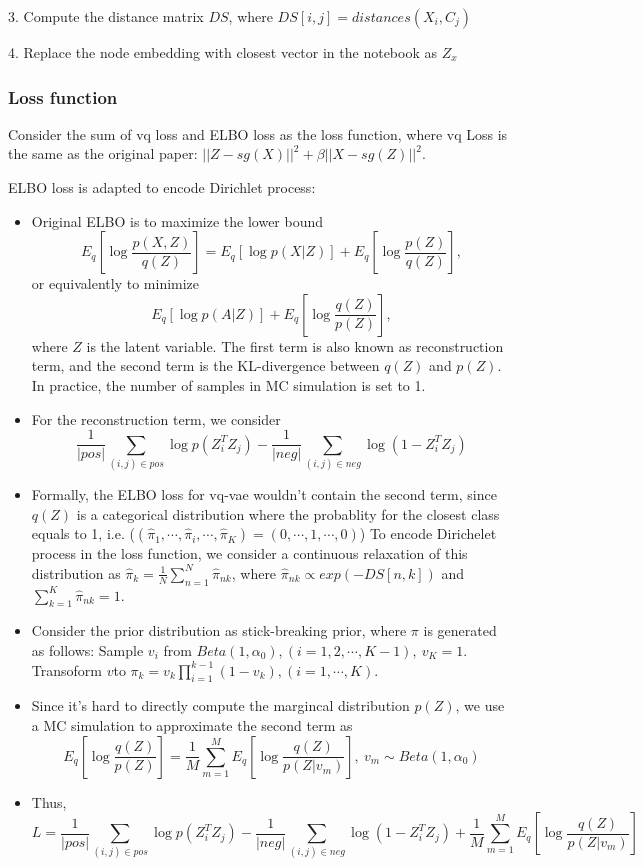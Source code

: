 \documentclass[12pt]{amsart}
\begin{document}
3. Compute the distance matrix $DS$, where $DS[i,j] = distances(X_i, C_j)$  

4. Replace the node embedding with closest vector in the notebook as $Z_x$

\subsubsection{Loss function}
\hfill

Consider the sum of vq loss and ELBO loss as the loss function, where vq Loss is the same as the original paper: $||Z-sg(X)||^2 + \beta ||X-sg(Z)||^2$.

ELBO loss is adapted to encode Dirichlet process: 
\begin{itemize}
    \item
    Original ELBO is to maximize the lower bound 
    \[E_q[ \log \frac{ p(X,Z) }{ q(Z) } ] = E_q[\log p(X|Z)] + E_q[ \log \frac{ p(Z) }{ q(Z) }],\]
    or equivalently to minimize
    \[ E_q[\log p(A|Z)]  + E_q[\log \frac{ q(Z) }{ p(Z) }],\]
    where $Z$ is the latent variable. The first term is also known as reconstruction term, and the second term is the KL-divergence between $q(Z)$ and $p(Z)$.
    In practice, the number of samples in MC simulation is set to 1.

    \item For the reconstruction term, we consider 
    \[ \frac{1}{|pos|} \sum_{(i,j) \in pos} \log p(Z_{i}^T Z_{j})- \frac{1}{|neg|}\sum_{(i,j) \in neg} \log(1-Z_i^T Z_j) \]

    \item 
    Formally, the ELBO loss for vq-vae wouldn't contain the second term, 
    since $q(Z)$ is a categorical distribution where the probablity for 
    the closest class equals to 1, i.e. ($(\hat{\pi}_1, \cdots, \hat{\pi}_i, \cdots, \hat{\pi}_K) = (0, \cdots, 1, \cdots, 0)$)
    To encode Dirichelet process in the loss function, we consider a continuous relaxation of this distribution as 
    $\hat{\pi}_k = \frac{1}{N}\sum_{n=1}^{N} \hat{\pi}_{nk}$, where $\hat{\pi}_{nk} \propto exp(-DS[n,k])$ and $\sum_{k=1}^{K}{\hat{\pi}_{nk}}=1$.
    \item 
    Consider the prior distribution as stick-breaking prior, where $\pi$ is generated as follows:
    \subitem Sample $v_i$ from $Beta(1, \alpha_0), (i=1, 2, \cdots, K-1), \ v_K = 1$.
    \subitem Transoform $v $to $\pi_k = v_k \prod_{i=1}^{k-1}(1-v_{k}), (i=1, \cdots, K).$
    \item Since it's hard to directly compute the margincal distribution $p(Z)$,
    we use a MC simulation to approximate the second term as 
    \[ E_q[\log \frac{q(Z)}{p(Z)}] = \frac{1}{M} \sum_{m=1}^M E_q[\log \frac{q(Z)}{p(Z|v_m)} ], \ v_m \sim Beta(1,\alpha_0) \]
    \item 
    Thus,
    \[  L = \frac{1}{|pos|} \sum_{(i,j) \in pos} \log p(Z_{i}^T Z_{j})- \frac{1}{|neg|}\sum_{(i,j) \in neg} \log(1-Z_i^T Z_j) + \frac{1}{M} \sum_{m=1}^M E_q[\log \frac{q(Z)}{p(Z|v_m)}] \]
\end{itemize}
\end{document}
